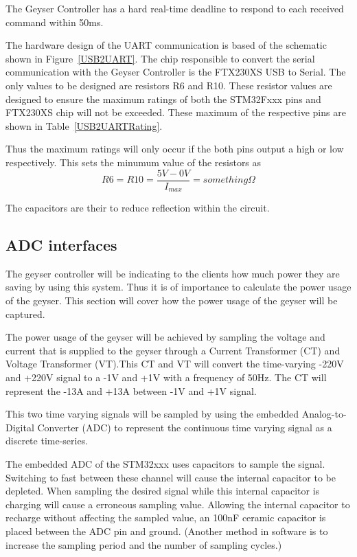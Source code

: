 \documentclass[11pt,a4paper]{article}
\begin{document}
The Geyser Controller has a hard real-time deadline to respond to each received command within 50ms.

The hardware design of the UART communication is based of the schematic shown in Figure~\ref{USB2UART}. The chip responsible to convert the serial communication with the Geyser Controller is the FTX230XS USB to Serial. The only values to be designed are resistors R6 and R10. These resistor values are designed to ensure the maximum ratings of both the STM32Fxxx pins and FTX230XS chip will not be exceeded. These maximum of the respective pins are shown in Table~\ref{USB2UARTRating}.

Thus the maximum ratings will only occur if the both pins output a high or low respectively. This sets the minumum value of the resistors as $$R6=R10 = \frac{5V-0V}{I_{max}} = something \Omega$$

The capacitors are their to reduce reflection within the circuit.
\subsection{ADC interfaces}
The geyser controller will be indicating to the clients how much power they are saving by using this system. Thus it is of importance to calculate the power usage of the geyser. This section will cover how the power usage of the geyser will be captured.

The power usage of the geyser will be achieved by sampling the voltage and current that is supplied to the geyser through a Current Transformer (CT) and Voltage Transformer (VT).This CT and VT will convert the time-varying -220V and +220V signal to a -1V and +1V with a frequency of 50Hz. The CT will represent the -13A and +13A between -1V and +1V signal.

This two time varying signals will be sampled by using the embedded Analog-to-Digital Converter (ADC) to represent the continuous time varying signal as a discrete time-series.

The embedded ADC of the STM32xxx uses capacitors to sample the signal. Switching to fast between these channel will cause the internal capacitor to be depleted. When sampling the desired signal while this internal capacitor is charging will cause a erroneous sampling value. Allowing the internal capacitor to recharge without affecting the sampled value, an 100nF ceramic capacitor is placed between the ADC pin and ground. (Another method in software is to increase the sampling period and the number of sampling cycles.)
\end{document}
